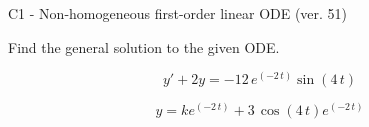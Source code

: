 \begin{exercise}
  \begin{exerciseTitle}C1 - Non-homogeneous first-order linear ODE (ver. 51)\end{exerciseTitle}
  \begin{exerciseStatement}
    
Find the general solution to the given ODE.

    
\[y'+2y= -12 \, e^{\left(-2 \, t\right)} \sin\left(4 \, t\right)\]

  \end{exerciseStatement}
  \begin{exerciseAnswer}
    
\[y= k e^{\left(-2 \, t\right)} + 3 \, \cos\left(4 \, t\right) e^{\left(-2 \, t\right)}\]

  \end{exerciseAnswer}
\end{exercise}